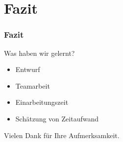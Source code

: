 \documentclass[t]{beamer}
\begin{document}
\section{Fazit}
\begin{frame}[c]
	\frametitle{Fazit}
\par\vspace{2mm}
	Was haben wir gelernt?
\par\vspace{2mm}
	\begin{itemize}
	\itemsep1em
	\item <+-> Entwurf
	\item <+-> Teamarbeit
	\item <+-> Einarbeitungszeit
	\item <+-> Schätzung von Zeitaufwand
	\end{itemize}
\end{frame}
\begin{frame}[c]
	\begin{center}
	Vielen Dank für Ihre Aufmerksamkeit.
	\end{center}
\end{frame}
\end{document}
